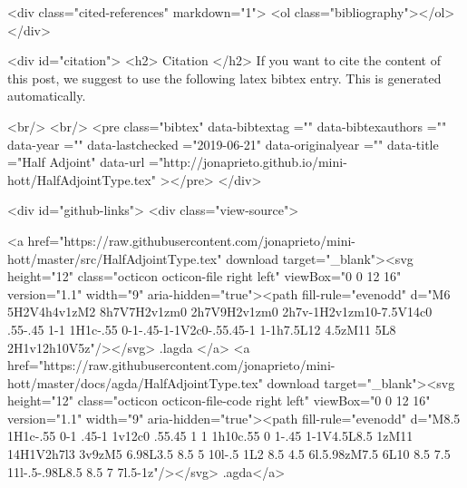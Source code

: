   <div class="cited-references" markdown="1">
  <ol class="bibliography"></ol>
  </div>


  
  <div id="citation">
  <h2> Citation </h2>
  If you want to cite the content of this post,
  we suggest to use the following latex bibtex entry.
  This is generated automatically.

  <br/>
  <br/>
  <pre class="bibtex"
       data-bibtextag =""
       data-bibtexauthors =""
       data-year =""
       data-lastchecked ="2019-06-21"
       data-originalyear =""
       data-title ="Half Adjoint"
       data-url ="http://jonaprieto.github.io/mini-hott/HalfAdjointType.tex"
  ></pre>
  </div>
  

  <div id="github-links">
    <div class="view-source">
      
        <a href="https://raw.githubusercontent.com/jonaprieto/mini-hott/master/src/HalfAdjointType.tex" download target="_blank"><svg height="12" class="octicon octicon-file right left" viewBox="0 0 12 16" version="1.1" width="9" aria-hidden="true"><path fill-rule="evenodd" d="M6 5H2V4h4v1zM2 8h7V7H2v1zm0 2h7V9H2v1zm0 2h7v-1H2v1zm10-7.5V14c0 .55-.45 1-1 1H1c-.55 0-1-.45-1-1V2c0-.55.45-1 1-1h7.5L12 4.5zM11 5L8 2H1v12h10V5z"/></svg> .lagda </a>
        <a href="https://raw.githubusercontent.com/jonaprieto/mini-hott/master/docs/agda/HalfAdjointType.tex" download target="_blank"><svg height="12" class="octicon octicon-file-code right left" viewBox="0 0 12 16" version="1.1" width="9" aria-hidden="true"><path fill-rule="evenodd" d="M8.5 1H1c-.55 0-1 .45-1 1v12c0 .55.45 1 1 1h10c.55 0 1-.45 1-1V4.5L8.5 1zM11 14H1V2h7l3 3v9zM5 6.98L3.5 8.5 5 10l-.5 1L2 8.5 4.5 6l.5.98zM7.5 6L10 8.5 7.5 11l-.5-.98L8.5 8.5 7 7l.5-1z"/></svg> .agda</a>
      
